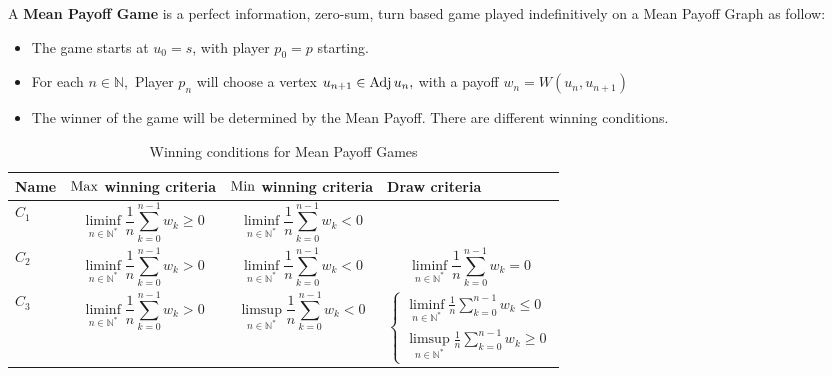 A  \textbf{Mean Payoff Game} is a perfect information, zero-sum, turn based game played indefinitively on a Mean Payoff Graph as follow:
\begin{itemize}
\item The game starts at $u_0=s$, with player $p_0=p$ starting.
\item For each $n\in\mathbb{N},$ Player $p_n$ will choose a vertex $u_{n+1}\in \operatorname{Adj} u_n,$ with a payoff $w_n=W(u_n,u_{n+1})$
\item The winner of the game will be determined by the Mean Payoff. There are different winning conditions.
\end{itemize}

\begin{table}[h]
	\small
	\begin{tabularx}{\textwidth}{| p{2cm} | X | X | X |}
		\hline
		
		Name & $\operatorname{Max}$ winning criteria & $\operatorname{Min}$ winning criteria & Draw criteria  \\
		\hline
		$C_1$ & \begin{equation*}
			\liminf_{n\in\mathbb{N}^*} \frac{1}{n}\sum_{k=0}^{n-1} w_k \ge 0
		\end{equation*} & \begin{equation*}
		\liminf_{n\in\mathbb{N}^*} \frac{1}{n}\sum_{k=0}^{n-1} w_k < 0
		\end{equation*} & \cellcolor{gray!75} \\
		\hline
		$C_2$ & \begin{equation*}
			\liminf_{n\in\mathbb{N}^*} \frac{1}{n}\sum_{k=0}^{n-1} w_k > 0
		\end{equation*} & \begin{equation*}
			\liminf_{n\in\mathbb{N}^*} \frac{1}{n}\sum_{k=0}^{n-1} w_k < 0
		\end{equation*} & \begin{equation*}
		\liminf_{n\in\mathbb{N}^*} \frac{1}{n}\sum_{k=0}^{n-1} w_k = 0
		\end{equation*} \\
		\hline
		 $C_3$ & \begin{equation*}
		 	\liminf_{n\in\mathbb{N}^*} \frac{1}{n}\sum_{k=0}^{n-1} w_k > 0
		 \end{equation*} & \begin{equation*}
		 	\limsup_{n\in\mathbb{N}^*} \frac{1}{n}\sum_{k=0}^{n-1} w_k < 0
		 \end{equation*} & \begin{equation*}
		 \begin{cases} 
		 	\displaystyle \liminf_{n\in\mathbb{N}^*} \frac{1}{n}\sum_{k=0}^{n-1} w_k \le 0 \\
		 	 \displaystyle \limsup_{n\in\mathbb{N}^*} \frac{1}{n}\sum_{k=0}^{n-1} w_k \ge 0
		 \end{cases}
		 \end{equation*}\\
		\hline
	\end{tabularx}
	\caption{Winning conditions for Mean Payoff Games
		\label{table:WinningConditions}}
\end{table}
